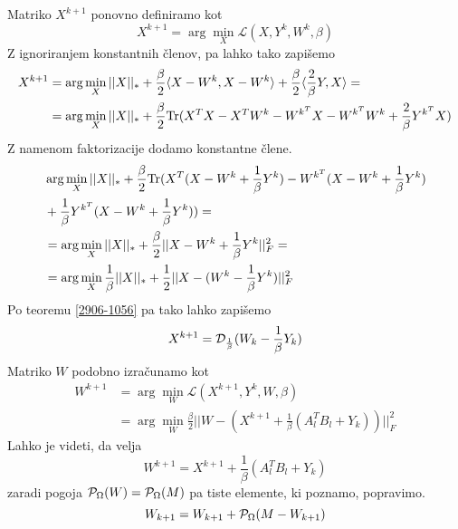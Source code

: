 Matriko $X^{k+1}$ ponovno definiramo kot 
\[
  X^{k+1} = \arg \min_X \mathcal{L}(X, Y^k, W^k, \beta)  
\]
Z ignoriranjem konstantnih členov, pa lahko tako zapišemo
\begin{align*}
  X^{k+1} &= \arg \min_X ||X||_* + \frac{\beta}{2}\langle X-W^k, X-W^k \rangle + \frac{\beta}{2}\langle \frac{2}{\beta}Y, X \rangle = \\
  &= \arg \min_X ||X||_* + \frac{\beta}{2}\text{Tr}(X^TX - X^TW^k - W^{k^T}X - W^{k^T}W^k + \frac{2}{\beta}Y^{k^T}X )
\end{align*}
Z namenom faktorizacije dodamo konstantne člene.
\begin{align*}
    &\arg \min_X ||X||_* + \frac{\beta}{2}\text{Tr}(X^T(X - W^k + \frac{1}{\beta}Y^k) - W^{k^T} (X - W^k + \frac{1}{\beta}Y^k)\\
    &+\frac{1}{\beta}Y^{k^T}(X - W^k + \frac{1}{\beta}Y^k)) =\\ 
  &= \arg \min_X ||X||_* + \frac{\beta}{2} ||X-W^k + \frac{1}{\beta}Y^k||^2_F = \\
  &= \arg \min_X \frac{1}{\beta}||X||_* +  \frac{1}{2}||X-(W^k - \frac{1}{\beta}Y^k)||^2_F
\end{align*}
Po teoremu \ref{2906-1056} pa tako lahko zapišemo 
\[
    X^{k+1} = \mathcal{D}_\frac{1}{\beta}(W_k - \frac{1}{\beta} Y_k)
\]
Matriko $W$ podobno izračunamo kot 
\begin{align*}
    W^{k+1} &= \arg \min_{W} \mathcal{L}(X^{k+1}, Y^k, W, \beta) \\ 
    &= \arg \min_W \frac{\beta}{2} ||W - (X^{k+1} + \frac{1}{\beta}(A_l^T B_l + Y_k)) ||^2_F
\end{align*}
Lahko je videti, da velja
\[
    W^{k+1} = X^{k+1} + \frac{1}{\beta}(A_l^T B_l + Y_k)
\]
zaradi pogoja $\mathcal{P}_\Omega(W) = \mathcal{P}_\Omega(M)$ pa tiste elemente, ki poznamo, popravimo. \cite{TNNM-HZYLH12}
\begin{equation}
    \label{2906-1248}
    W_{k+1} = W_{k+1} + \mathcal{P}_\Omega(M - W_{k+1})
\end{equation}
